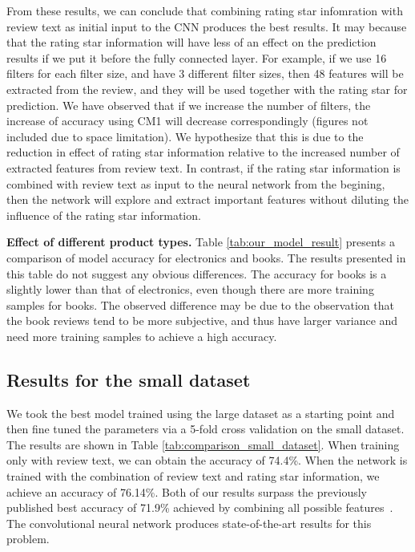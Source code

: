 \documentclass[conference,compsoc]{IEEEtran}
\begin{document}
From these results, we can conclude that combining rating star infomration with review text as initial input to the CNN produces the best results. It may because that the rating star information will have less of an effect on the prediction results if we put it before the fully connected layer. For example, if we use 16 filters for each filter size, and have 3 different filter sizes, then 48 features will be extracted from the review, and they will be used together with the rating star for prediction. We have observed that if we increase the number of filters, the increase of accuracy using CM1 will decrease correspondingly (figures not included due to space limitation). We hypothesize that this is due to the reduction in effect of rating star information relative to the increased number of extracted features from review text. In contrast, if the rating star information is combined with review text as input to the neural network from the begining, then the network will explore and extract important features without diluting the influence of the rating star information.

\textbf{Effect of different product types.} Table \ref{tab:our_model_result} presents a comparison of model accuracy for electronics and books. The results presented in this table do not suggest any obvious differences. The accuracy for books is a slightly lower than that of electronics, even though there are more training samples for books. The observed difference may be due to the observation that the book reviews tend to be more subjective, and thus have larger variance and need more training samples to achieve a high accuracy. 

\subsection{Results for the small dataset}%
We took the best model trained using the large dataset as a starting point and then fine tuned the parameters via a 5-fold cross validation on the small dataset. The results are shown in Table \ref{tab:comparison_small_dataset}. When training only with review text, we can obtain the accuracy of 74.4\%. When the network is trained with the combination of review text and rating star information, we achieve an accuracy of 76.14\%. Both of our results surpass the previously published best accuracy of 71.9\% achieved by combining all possible features~\cite{Hong_2012}. The convolutional neural network produces state-of-the-art results for this problem.
\end{document}
